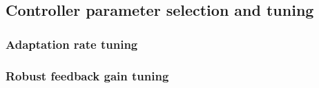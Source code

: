 \subsection{Controller parameter selection and tuning}
\subsubsection{Adaptation rate tuning}
\subsubsection{Robust feedback gain tuning}
